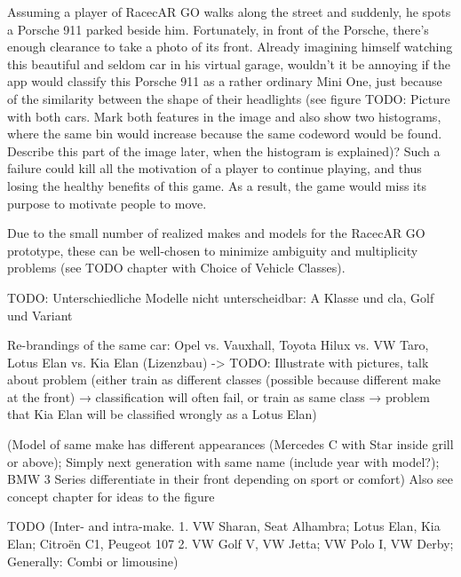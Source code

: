 Assuming a player of RacecAR GO walks along the street and suddenly, he spots a Porsche 911 parked beside him. Fortunately, in front of the Porsche, there's enough clearance to take a photo of its front. Already imagining himself watching this beautiful and seldom car in his virtual garage, wouldn't it be annoying if the app would classify this Porsche 911 as a rather ordinary Mini One, just because of the similarity between the shape of their headlights (see figure TODO: Picture with both cars. Mark both features in the image and also show two histograms, where the same bin would increase because the same codeword would be found. Describe this part of the image later, when the histogram is explained)? Such a failure could kill all the motivation of a player to continue playing, and thus losing the healthy benefits of this game. As a result, the game would miss its purpose to motivate people to move.

Due to the small number of realized makes and models for the RacecAR GO prototype, these can be well-chosen to minimize ambiguity and multiplicity problems (see TODO chapter with Choice of Vehicle Classes).

TODO: Unterschiedliche Modelle nicht unterscheidbar:
A Klasse und cla, Golf und Variant

Re-brandings of the same car: Opel vs. Vauxhall, Toyota Hilux vs. VW Taro, Lotus Elan vs. Kia Elan (Lizenzbau) -> TODO: Illustrate with pictures, talk about problem (either train as different classes (possible because different make at the front) → classification will often fail, or train as same class → problem that Kia Elan will be classified wrongly as a Lotus Elan)

(Model of same make has different appearances (Mercedes C with Star inside grill or above); Simply next generation with same name (include year with model?); BMW 3 Series differentiate in their front depending on sport or comfort) Also see concept chapter for ideas to the figure

TODO (Inter- and intra-make.
1. VW Sharan, Seat Alhambra; Lotus Elan, Kia Elan; Citroën C1, Peugeot 107 2. VW Golf V, VW Jetta; VW Polo I, VW Derby; Generally: Combi or limousine)

